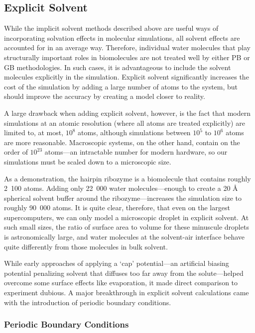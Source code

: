 \subsection{Explicit Solvent}

While the implicit solvent methods described above are useful ways of
incorporating solvation effects in molecular simulations, all solvent effects
are accounted for in an average way. Therefore, individual water molecules that
play structurally important roles in biomolecules are not treated well by either
PB or GB methodologies. In such cases, it is advantageous to include the solvent
molecules explicitly in the simulation. Explicit solvent significantly increases
the cost of the simulation by adding a large number of atoms to the system, but
should improve the accuracy by creating a model closer to reality.

A large drawback when adding explicit solvent, however, is the fact that modern
simulations at an atomic resolution (\ie where all atoms are treated explicitly)
are limited to, at most, $10^8$ atoms, \cite{100M_Stupid} although simulations
between $10^5$ to $10^6$ atoms are more reasonable. Macroscopic systems, on the
other hand, contain on the order of $10^{23}$ atoms---an intractable number for
modern hardware, so our simulations must be scaled down to a microscopic size.

As a demonstration, the hairpin ribozyme is a biomolecule that contains roughly
\mbox{2 100} atoms. Adding only \mbox{22 000} water molecules---enough to create
a 20 {\AA} spherical solvent buffer around the ribozyme---increases the
simulation size to roughly \mbox{90 000} atoms. It is quite clear, therefore,
that even on the largest supercomputers, we can only model a microscopic droplet
in explicit solvent. At such small sizes, the ratio of surface area to volume
for these minuscule droplets is astronomically large, and water molecules at the
solvent-air interface behave quite differently from those molecules in bulk
solvent.

While early approaches of applying a `cap' potential---an artificial biasing
potential penalizing solvent that diffuses too far away from the solute---helped
overcome some surface effects like evaporation, it made direct comparison to
experiment dubious. A major breakthrough in explicit solvent calculations came
with the introduction of periodic boundary conditions. \cite{Allen_Tildesley}

\subsubsection{Periodic Boundary Conditions}

